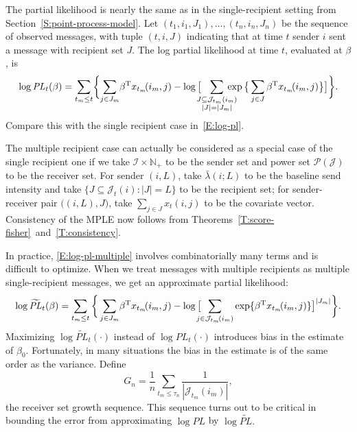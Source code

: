\documentclass[aoas,preprint]{imsart}
\begin{document}
The partial likelihood is nearly the same as in the single-recipient
setting from Section~\ref{S:point-process-model}.
Let $(t_1, i_1, J_1), \ldots, (t_n, i_n, J_n)$ be the sequence of
observed messages, with tuple $(t, i, J)$ indicating that at time $t$
sender $i$ sent a message with recipient set $J$.  The log partial likelihood
at time $t$, evaluated at $\beta$, is
\begin{equation}\label{E:log-pl-multiple}
    \log
    \mathit{PL}_t(\beta)
        =
        \sum_{t_m \leq t}\!
        \bigg\{\!
            \sum_{j \in J_m}\!
                \beta^\trans x_{t_m}\!(i_m, j)
            -
            \log\big[
                \!\!\!\!
                \sum_{\substack{J \subseteq \mathcal{J}_{t_m}(i_m) \\
                               |J| = |J_m|}}\!\!\!\!\!\!\!
                    \exp\big\{
                        \sum_{j \in J}
                            \beta^\trans x_{t_m}\!(i_m, j)
                    \big\}
            \big]
        \bigg\}.
\end{equation}
Compare this with the single recipient case in~\eqref{E:log-pl}.

The multiple recipient case can actually be considered as a special case of
the single recipient one if we take $\mathcal{I} \times \mathbb{N}_+$
to be the sender set and power set $\mathcal{P}(\mathcal{J})$ to be the
receiver set.  For sender $(i,L)$, take $\bar \lambda(i ; L)$ to be the
baseline send intensity and take
$\{ J \subseteq \mathcal{J}_t(i) : |J| = L\}$ to be the recipient set; for
sender-receiver pair $\big((i,L), J\big)$, take $\sum_{j \in J} x_t(i,j)$ to
be the covariate vector.  Consistency of the MPLE now follows from
Theorems~\ref{T:score-fisher}~and~\ref{T:consistency}.

In practice, \eqref{E:log-pl-multiple} involves combinatorially many terms
and is difficult to optimize.  When we treat messages with multiple recipients
as multiple single-recipient messages, we get an approximate partial
likelihood:
\begin{equation}\label{E:log-pl-multiple-approx}
    \log
    \widetilde{\mathit{PL}}_t(\beta)
        =
        \sum_{t_m \leq t}
        \bigg\{
            \sum_{j \in J_m}\!
                \beta^\trans x_{t_m}\!(i_m, j)
            -
            \log\big[
                \!\!\!\!
                \sum_{j \in \mathcal{J}_{t_m}\!(i_m)}
                    \exp\{ \beta^\trans x_{t_m}\!(i_m, j)\}
            \big]^{|J_m|}
        \bigg\}.
\end{equation}
Maximizing $\log \widetilde{\mathit{PL}}_t(\cdot)$ instead of
$\log \mathit{PL}_t(\cdot)$ introduces bias in the estimate of $\beta_0$.
Fortunately, in many situations the bias in the estimate is of the same order
as the variance. Define
\begin{equation}\label{E:growth-constant}
    G_n
        =
            \frac{1}{n}
            \sum_{t_m \leq \tau_n}
                \frac{1}{|\mathcal{J}_{t_m}(i_m)|},
\end{equation}
the receiver set growth sequence.  This sequence turns out to be critical
in bounding the error from approximating $\log \mathit{PL}$ by
$\log \widetilde{\mathit{PL}}.$
\end{document}
